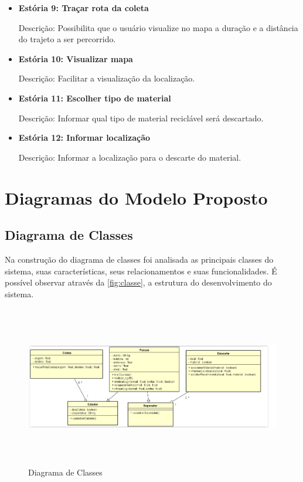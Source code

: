\begin{itemize}
	\item \textbf{Estória 9: Traçar rota da coleta}\par
Descrição: Possibilita que o usuário visualize no mapa a duração e a distância do trajeto a ser percorrido.

	\item \textbf{Estória 10: Visualizar mapa}\par
Descrição: Facilitar a visualização da localização.

	\item \textbf{Estória 11: Escolher tipo de material}\par
Descrição: Informar qual tipo de material reciclável será descartado.

	\item \textbf{Estória 12: Informar localização}\par
Descrição: Informar a localização para o descarte do material.
\end{itemize}


\section{Diagramas do Modelo Proposto}

\subsection{Diagrama de Classes}

Na construção do diagrama de classes foi analisada as principais classes do sistema, suas características, seus relacionamentos e suas funcionalidades. É possível observar através da \autoref{fig:classe}, a estrutura do desenvolvimento do sistema.


\begin{figure}[H]
	\begin{Center}
		\includegraphics[width=6.4in,height=2.77in]{./media/image35.png}
	\end{Center}
	\caption{Diagrama de Classes}
	\label{fig:classe}
\end{figure}


